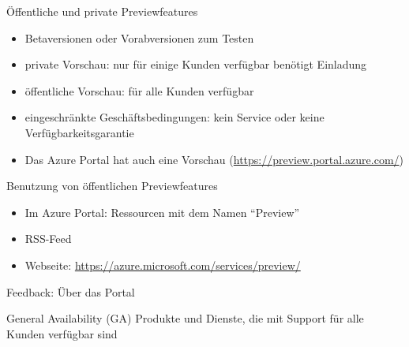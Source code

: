 
\begin{flashcard}[Definition]{Öffentliche und private Previewfeatures}
    \begin{itemize}
        \item Betaversionen oder Vorabversionen zum Testen
        \item private Vorschau: nur für einige Kunden verfügbar\newline
            benötigt Einladung
        \item öffentliche Vorschau: für alle Kunden verfügbar
        \item eingeschränkte Geschäftsbedingungen: kein Service oder keine Verfügbarkeitsgarantie
        \item Das Azure Portal hat auch eine Vorschau\newline
            (\href{https://preview.portal.azure.com/}{https://preview.portal.azure.com/})
    \end{itemize}
\end{flashcard}

\begin{flashcard}[\ ]{Benutzung von öffentlichen Previewfeatures}
    \begin{itemize}
        \item Im Azure Portal: Ressourcen mit dem Namen ``Preview''
        \item RSS-Feed
        \item Webseite: \href{https://azure.microsoft.com/services/preview/}{https://azure.microsoft.com/services/preview/}
    \end{itemize}

    \vspace{5mm}
    Feedback: Über das Portal
\end{flashcard}

\begin{flashcard}[Definition]{General Availability (GA)}
    Produkte und Dienste, die mit Support für alle Kunden verfügbar sind
\end{flashcard}

